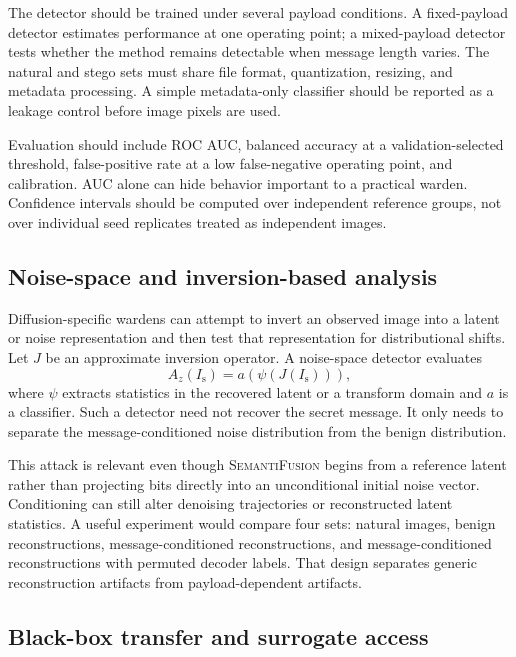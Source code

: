 \documentclass[pdflatex,sn-mathphys-num]{sn-jnl}
\newcommand{\method}{\textsc{SemantiFusion}}
\newcommand{\stego}{I_{\mathrm{s}}}
\begin{document}
The detector should be trained under several payload conditions. A fixed-payload detector estimates performance at one operating point; a mixed-payload detector tests whether the method remains detectable when message length varies. The natural and stego sets must share file format, quantization, resizing, and metadata processing. A simple metadata-only classifier should be reported as a leakage control before image pixels are used.

Evaluation should include ROC AUC, balanced accuracy at a validation-selected threshold, false-positive rate at a low false-negative operating point, and calibration. AUC alone can hide behavior important to a practical warden. Confidence intervals should be computed over independent reference groups, not over individual seed replicates treated as independent images.

\subsection{Noise-space and inversion-based analysis}

Diffusion-specific wardens can attempt to invert an observed image into a latent or noise representation and then test that representation for distributional shifts. Let $J$ be an approximate inversion operator. A noise-space detector evaluates
\begin{equation}
A_{z}(\stego)=a\!\left(\psi(J(\stego))\right),
\label{eq:noisedetector}
\end{equation}
where $\psi$ extracts statistics in the recovered latent or a transform domain and $a$ is a classifier. Such a detector need not recover the secret message. It only needs to separate the message-conditioned noise distribution from the benign distribution.

This attack is relevant even though \method{} begins from a reference latent rather than projecting bits directly into an unconditional initial noise vector. Conditioning can still alter denoising trajectories or reconstructed latent statistics. A useful experiment would compare four sets: natural images, benign reconstructions, message-conditioned reconstructions, and message-conditioned reconstructions with permuted decoder labels. That design separates generic reconstruction artifacts from payload-dependent artifacts.

\subsection{Black-box transfer and surrogate access}
\end{document}
